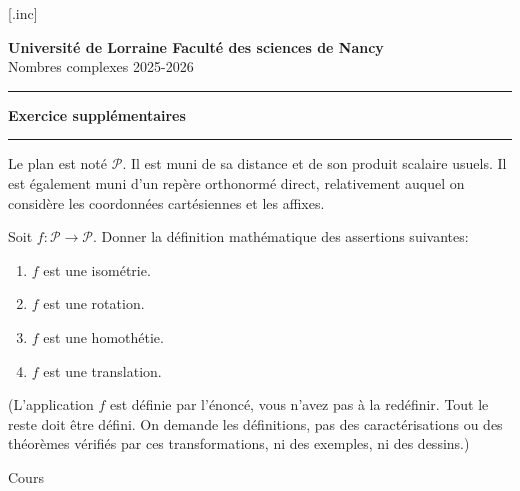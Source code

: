 



\pagestyle{empty}






[\jobname.inc]



\newpage
\noindent \textbf{\textsf{Université de Lorraine \hfill Faculté des sciences de Nancy}}\\
\textsf{Nombres complexes \hfill 2025-2026}
\smallskip\hrule 
\begin{center}
{\huge \textbf{Exercice supplémentaires}}
\end{center}
\smallskip\hrule 

Le plan est noté $\mathcal P$. Il est muni de sa distance et de son produit scalaire usuels. Il est également muni d'un repère orthonormé direct, relativement auquel on considère les coordonnées cartésiennes et les affixes.


\begin{exo}%
Soit $f:\mathcal P\to \mathcal P$. Donner la définition mathématique des assertions suivantes:
\begin{multicols}{4}
\begin{enumerate}
\item $f$ est une isométrie.
\item $f$ est une rotation.
\item $f$ est une homothétie.
\item $f$ est une translation.
\end{enumerate}
\end{multicols}
(L'application $f$ est définie par l'énoncé, vous n'avez pas à la redéfinir. Tout le reste doit être défini. On demande les définitions, pas des caractérisations ou des théorèmes vérifiés par ces transformations, ni des exemples, ni des dessins.)
\begin{sol}
Cours
\end{sol}
\end{exo}


